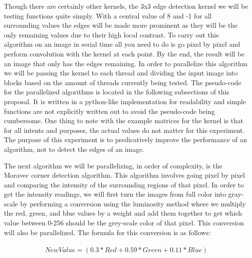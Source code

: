 \documentclass{article}
\begin{document}
        Though there are certainly other kernels, the 3x3 edge detection kernel we will be testing functions quite simply.  With a central value of 8 and -1 for all surrounding values the edges will be made more prominent as they will be the only remaining values due to their high local contrast.  To carry out this algorithm on an image in serial time all you need to do is go pixel by pixel and perform convolution with the kernel at each point.  By the end, the result will be an image that only has the edges remaining.  In order to parallelize this algorithm we will be passing the kernel to each thread and dividing the input image into blocks based on the amount of threads currently being tested.  The pseudo-code for the parallelized algorithms is located in the following subsections of this proposal.  It is written in a python-like implementation for readability and simple functions are not explicitly written out to avoid the pseudo-code being cumbersome.  One thing to note with the example matrices for the kernel is that for all intents and purposes, the actual values do not matter for this experiment.  The purpose of this experiment is to predicatively improve the performance of an algorithm, not to detect the edges of an image.
        
        The next algorithm we will be parallelizing, in order of complexity, is the Moravec corner detection algorithm.  This algorithm involves going pixel by pixel and comparing the intensity of the surrounding regions of that pixel.  In order to get the intensity readings, we will first turn the images from full color into gray-scale by performing a conversion using the luminosity method where we multiply the red, green, and blue values by a weight and add them together to get which value between 0-256 should be the grey-scale color of that pixel.  This conversion will also be parallelized.  The formula for this conversion is as follows:\\\\
        
        \[New Value = (0.3*Red + 0.59*Green + 0.11*Blue)\]\\
        
\end{document}
